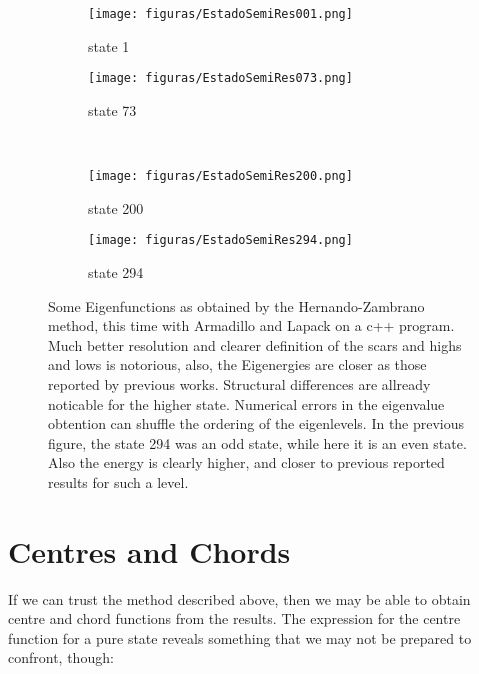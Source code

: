 \documentclass[a4paper,12pt]{article}
\begin{document}
\begin{figure}[h]
  \centering
  \begin{subfigure}[b]{0.48\textwidth}
    \texttt{[image: figuras/EstadoSemiRes001.png]}
    \caption{state 1}
    \label{fig:gull}
  \end{subfigure}%
  \begin{subfigure}[b]{0.48\textwidth}
    \texttt{[image: figuras/EstadoSemiRes073.png]}
    \caption{state 73}
    \label{fig:tiger}
  \end{subfigure}\\
  \begin{subfigure}[b]{0.48\textwidth}
    \texttt{[image: figuras/EstadoSemiRes200.png]}
    \caption{state 200}
    \label{fig:mouse}
  \end{subfigure}
  \begin{subfigure}[b]{0.48\textwidth}
    \texttt{[image: figuras/EstadoSemiRes294.png]}
    \caption{state 294}
    \label{fig:mouse}
  \end{subfigure}
  \caption{Some Eigenfunctions as obtained by the Hernando-Zambrano method,
this time with Armadillo and Lapack on a  c++   
program. Much better resolution
and clearer definition of the scars and highs and lows is notorious, also, the
Eigenergies are closer as those reported by previous works. Structural differences 
are allready noticable for the higher state. Numerical errors in the eigenvalue
obtention can shuffle the ordering of the eigenlevels. In the previous figure, the
state 294 was an odd state, while here it is an even state. Also the energy
is clearly higher, and closer to previous reported results for such a level.} 
  \label{muestrasintentomejor}
\end{figure}
 

\section{Centres and Chords}

If we can trust the method described above, then we may be able to
obtain centre and chord functions from the results. The expression
for the centre function for a pure state  
reveals something that we may not be prepared
to confront, though:
\end{document}
